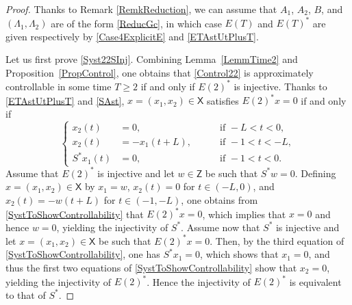 \begin{proof}
Thanks to Remark \ref{RemkReduction}, we can assume that $A_1$, $A_2$, $B$, and $(\Lambda_1, \Lambda_2)$ are of the form \eqref{ReducGc}, in which case $E(T)$ and $E(T)^\ast$ are given respectively by \eqref{Case4ExplicitE} and \eqref{ETAstUtPlusT}.

Let us first prove \eqref{Syst22SInj}. Combining Lemma~\ref{LemmTime2} and Proposition~\ref{PropControl}, one obtains that \eqref{Control22} is approximately controllable in some time $T \geq 2$ if and only if $E(2)^\ast$ is injective. Thanks to \eqref{ETAstUtPlusT} and \eqref{SAst}, $x = (x_1, x_2) \in \mathsf X$ satisfies $E(2)^\ast x = 0$ if and only if
\begin{equation}
\label{SystToShowControllability}
\left\{
\begin{aligned}
x_2(t) & = 0, & \quad & \text{ if } -L < t < 0, \\
x_2(t) & = -x_1(t + L) , & & \text{ if } -1 < t < -L, \\
S^\ast x_1(t) & = 0, & & \text{ if } -1 < t < 0.
\end{aligned}
\right.
\end{equation}
Assume that $E(2)^\ast$ is injective and let $w \in \mathsf Z$ be such that $S^\ast w = 0$. Defining $x = (x_1, x_2) \in \mathsf X$ by $x_1 = w$, $x_2(t) = 0$ for $t \in (-L, 0)$, and $x_2(t) = -w(t + L)$ for $t \in (-1, -L)$, one obtains from \eqref{SystToShowControllability} that $E(2)^\ast x = 0$, which implies that $x = 0$ and hence $w = 0$, yielding the injectivity of $S^\ast$. Assume now that $S^\ast$ is injective and let $x = (x_1, x_2) \in \mathsf X$ be such that $E(2)^\ast x = 0$. Then, by the third equation of \eqref{SystToShowControllability}, one has $S^\ast x_1 = 0$, which shows that $x_1 = 0$, and thus the first two equations of \eqref{SystToShowControllability} show that $x_2 = 0$, yielding the injectivity of $E(2)^\ast$. Hence the injectivity of $E(2)^\ast$ is equivalent to that of $S^\ast$.


\end{proof}
